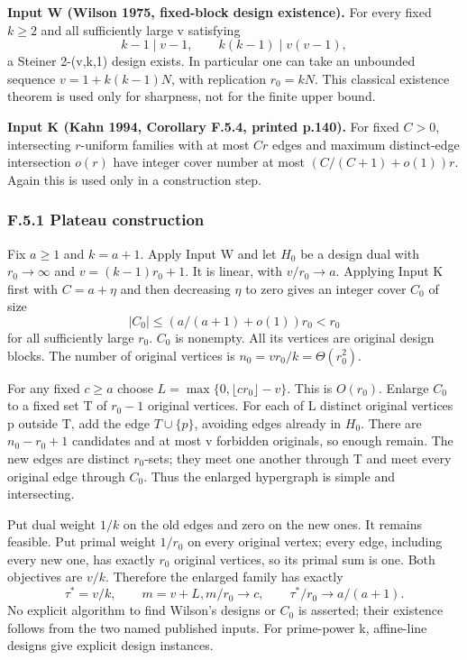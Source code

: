 \documentclass[
  11pt,
]{article}
\begin{document}
\textbf{Input W (Wilson 1975, fixed-block design existence).} For every
fixed \(k\ge2\) and all sufficiently large v satisfying \[
             k-1\mid v-1,\qquad k(k-1)\mid v(v-1),          \tag{F.11}
\] a Steiner 2-(v,k,1) design exists. In particular one can take an
unbounded sequence \(v=1+k(k-1)N\), with replication \(r_0=kN\). This
classical existence theorem is used only for sharpness, not for the
finite upper bound.

\textbf{Input K (Kahn 1994, Corollary F.5.4, printed p.140).} For fixed
\(C>0\), intersecting \(r\)-uniform families with at most \(Cr\) edges
and maximum distinct-edge intersection \(o(r)\) have integer cover
number at most \((C/(C+1)+o(1))r\). Again this is used only in a
construction step.

\subsubsection{F.5.1 Plateau
construction}\label{f.5.1-plateau-construction}

Fix \(a\ge1\) and \(k=a+1\). Apply Input W and let \(H_0\) be a design
dual with \(r_0\to\infty\) and \(v=(k-1)r_0+1\). It is linear, with
\(v/r_0\to a\). Applying Input K first with \(C=a+\eta\) and then
decreasing \(\eta\) to zero gives an integer cover \(C_0\) of size \[
                  |C_0|\le(a/(a+1)+o(1))r_0<r_0           \tag{F.12}
\] for all sufficiently large \(r_0\). \(C_0\) is nonempty. All its
vertices are original design blocks. The number of original vertices is
\(n_0=v r_0/k=\Theta(r_0^2)\).

For any fixed \(c\ge a\) choose \(L=\max\{0,\lfloor c r_0\rfloor-v\}\).
This is \(O(r_0)\). Enlarge \(C_0\) to a fixed set T of \(r_0-1\)
original vertices. For each of L distinct original vertices p outside T,
add the edge \(T\cup\{p\}\), avoiding edges already in \(H_0\). There
are \(n_0-r_0+1\) candidates and at most v forbidden originals, so
enough remain. The new edges are distinct \(r_0\)-sets; they meet one
another through T and meet every original edge through \(C_0\). Thus the
enlarged hypergraph is simple and intersecting.

Put dual weight \(1/k\) on the old edges and zero on the new ones. It
remains feasible. Put primal weight \(1/r_0\) on every original vertex;
every edge, including every new one, has exactly \(r_0\) original
vertices, so its primal sum is one. Both objectives are \(v/k\).
Therefore the enlarged family has exactly \[
                    \tau^*=v/k,\qquad m=v+L,
       m/r_0\to c,\qquad\tau^*/r_0\to a/(a+1).             \tag{F.13}
\] No explicit algorithm to find Wilson's designs or \(C_0\) is
asserted; their existence follows from the two named published inputs.
For prime-power k, affine-line designs give explicit design instances.
\end{document}
